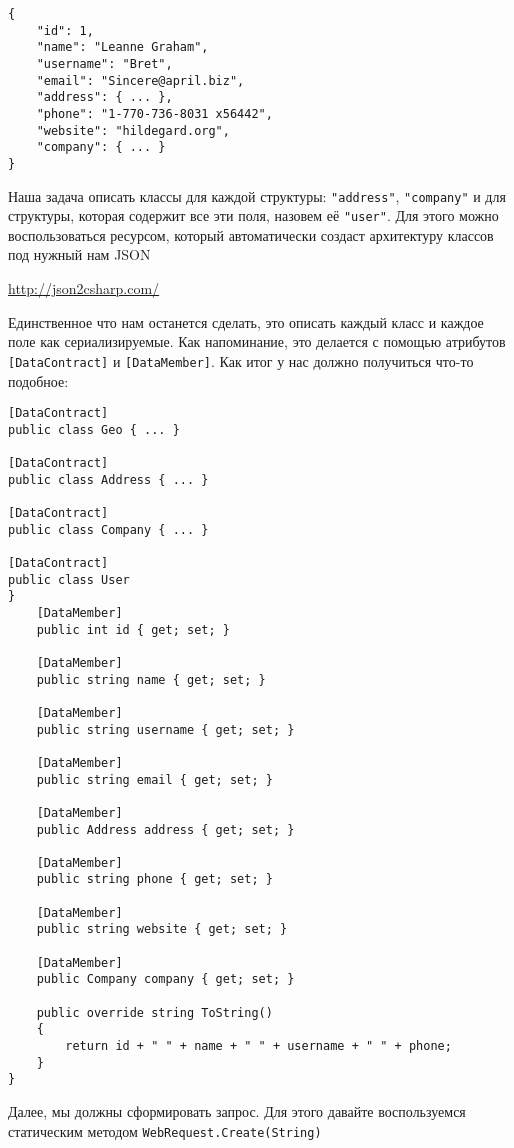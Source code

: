 \begin{verbatim}
{
    "id": 1,
    "name": "Leanne Graham",
    "username": "Bret",
    "email": "Sincere@april.biz",
    "address": { ... },
    "phone": "1-770-736-8031 x56442",
    "website": "hildegard.org",
    "company": { ... }
}
\end{verbatim}

\newpage

Наша задача описать классы для каждой структуры: \texttt{"address"}, \texttt{"company"} и для структуры, которая содержит все эти поля, назовем её  \texttt{"user"}. Для этого можно воспользоваться ресурсом, который автоматически создаст архитектуру классов под нужный нам JSON

\url{http://json2csharp.com/}

Единственное что нам останется сделать, это описать каждый класс и каждое поле как сериализируемые. Как напоминание, это делается с помощью атрибутов \texttt{[DataContract]} и \texttt{[DataMember]}. Как итог у нас должно получиться что-то подобное:

\begin{verbatim}
[DataContract]
public class Geo { ... }

[DataContract]
public class Address { ... }

[DataContract]
public class Company { ... }

[DataContract]
public class User
}
    [DataMember]
    public int id { get; set; }

    [DataMember]
    public string name { get; set; }

    [DataMember]
    public string username { get; set; }

    [DataMember]
    public string email { get; set; }

    [DataMember]
    public Address address { get; set; }

    [DataMember]
    public string phone { get; set; }

    [DataMember]
    public string website { get; set; }

    [DataMember]
    public Company company { get; set; }

    public override string ToString()
    {
        return id + " " + name + " " + username + " " + phone;
    }
}
\end{verbatim}

Далее, мы должны сформировать запрос. Для этого давайте воспользуемся статическим методом \texttt{WebRequest.Create(String)}

